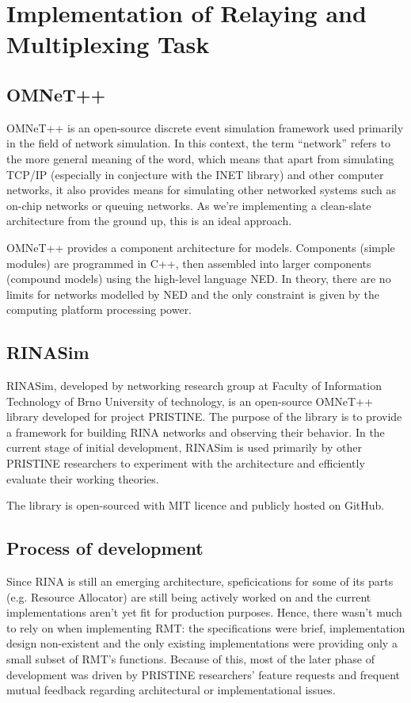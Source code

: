 \chapter{Implementation of Relaying and Multiplexing Task}\label{implementation}

    \section{OMNeT++}

        OMNeT++ is an open-source discrete event simulation framework used primarily in the field of network simulation. In this context, the term ``network'' refers to the more general meaning of the word, which means that apart from simulating TCP/IP (especially in conjecture with the INET library) and other computer networks, it also provides means for simulating other networked systems such as on-chip networks or queuing networks. As we're implementing a clean-slate architecture from the ground up, this is an ideal approach.

        OMNeT++ provides a component architecture for models. Components (simple modules) are programmed in C++, then assembled into larger components (compound models) using the high-level language NED. In theory, there are no limits for networks modelled by NED and the only constraint is given by the computing platform processing power.

    \section{RINASim}

        RINASim, developed by networking research group at Faculty of Information Technology of Brno University of technology, is an open-source OMNeT++ library developed for project PRISTINE. The purpose of the library is to provide a framework for building RINA networks and observing their behavior. In the current stage of initial development, RINASim is used primarily by other PRISTINE researchers to experiment with the architecture and efficiently evaluate their working theories.

        The library is open-sourced with MIT licence and publicly hosted on GitHub.

    \section{Process of development}

        Since RINA is still an emerging architecture, speficications for some of its parts (e.g. Resource Allocator) are still being actively worked on and the current implementations aren't yet fit for production purposes. Hence, there wasn't much to rely on when implementing RMT: the specifications were brief, implementation design non-existent and the only existing implementations were providing only a small subset of RMT's functions. Because of this, most of the later phase of development was driven by PRISTINE researchers' feature requests and frequent mutual feedback regarding architectural or implementational issues.

